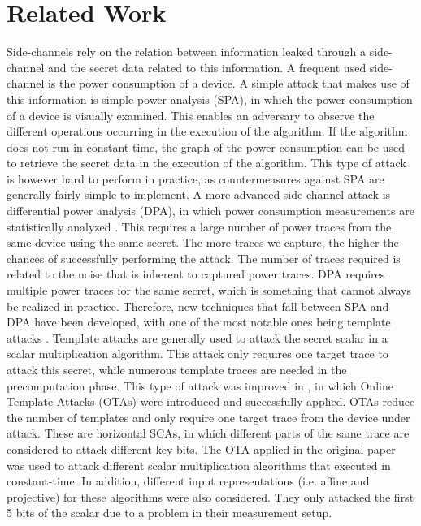 \section{Related Work}
Side-channels rely on the relation between information leaked through a side-channel and the secret data related to this information. 
A frequent used side-channel is the power consumption of a device.
A simple attack that makes use of this information is simple power analysis (SPA), in which the power consumption of a device is visually examined.
This enables an adversary to observe the different operations occurring in the execution of the algorithm.
If the algorithm does not run in constant time, the graph of the power consumption can be used to retrieve the secret data in the execution of the algorithm.
This type of attack is however hard to perform in practice, as countermeasures against SPA are generally fairly simple to implement.
A more advanced side-channel attack is differential power analysis (DPA), in which power consumption measurements are statistically analyzed \cite{kocher1999differential}.
This requires a large number of power traces from the same device using the same secret.
The more traces we capture, the higher the chances of successfully performing the attack.
The number of traces required is related to the noise that is inherent to captured power traces.
DPA requires multiple power traces for the same secret, which is something that cannot always be realized in practice.
Therefore, new techniques that fall between SPA and DPA have been developed, with one of the most notable ones being template attacks \cite{chari2002template, rechberger2004practical, choudary2013efficient}.
Template attacks are generally used to attack the secret scalar in a scalar multiplication algorithm.
This attack only requires one target trace to attack this secret, while numerous template traces are needed in the precomputation phase.
This type of attack was improved in \cite{batina2014online}, in which Online Template Attacks (OTAs) were introduced and successfully applied.
OTAs reduce the number of templates and only require one target trace from the device under attack.
These are horizontal SCAs, in which different parts of the same trace are considered to attack different key bits.
The OTA applied in the original paper was used to attack different scalar multiplication algorithms that executed in constant-time.
In addition, different input representations (i.e. affine and projective) for these algorithms were also considered.
They only attacked the first 5 bits of the scalar due to a problem in their measurement setup.
